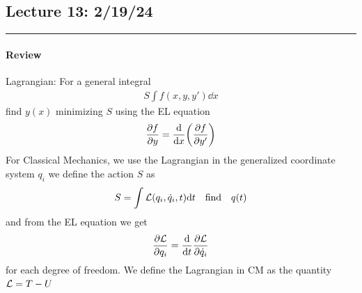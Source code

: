 \documentclass[../main.tex]{subfiles}
\begin{document}
\newpage
\subsection*{Lecture 13: \hfill 2/19/24}
\hrule \vspace{10px}

\paragraph*{Review} Lagrangian: For a general integral
\begin{align*}
    S \int f(x,y, y') \dd x
\end{align*}
find $y(x)$ minimizing $S$ using the EL equation
\begin{align*}
    \pdv{f}{y} = \dv{x}(\pdv{f}{y'})
\end{align*}
For Classical Mechanics, we use the Lagrangian in the generalized coordinate system $q_i$ we define
the action $S$ as
\begin{align*}
    S = \int \lagr (q_i, \dot q_i, t) \dd t \qqtext{find} q(t)
\end{align*}
and from the EL equation we get
\begin{align*}
    \pdv{\mathcal{L}}{q_i} = \dv{t} \pdv{\mathcal{L}}{\dot q_i}
\end{align*}
for each degree of freedom. We define the Lagrangian in CM as the quantity $\mathcal{L} = T - U$
\end{document}
